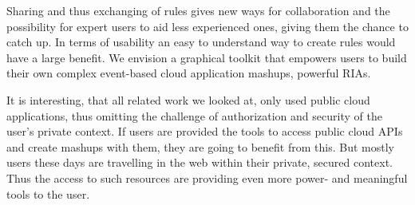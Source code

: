\documentclass[11pt]{article}%
\begin{document}
Sharing and thus exchanging of rules gives new ways for collaboration and the possibility for expert users to aid less experienced ones, giving them the chance to catch up. 
In terms of usability an easy to understand way to create rules would have a large benefit. We envision a graphical toolkit that empowers users to build their own complex event-based cloud application mashups, powerful RIAs.

It is interesting, that all related work we looked at, only used public cloud applications, thus omitting the challenge of authorization and security of the user's private context.
If users are provided the tools to access public cloud APIs and create mashups with them, they are going to benefit from this. But mostly users these days are travelling in the web within their private, secured context. Thus the access to such resources are providing even more power- and meaningful tools to the user. 




\newpage
\appendix
\renewcommand\thesection{Appendix \Alph{section}}
\end{document}
